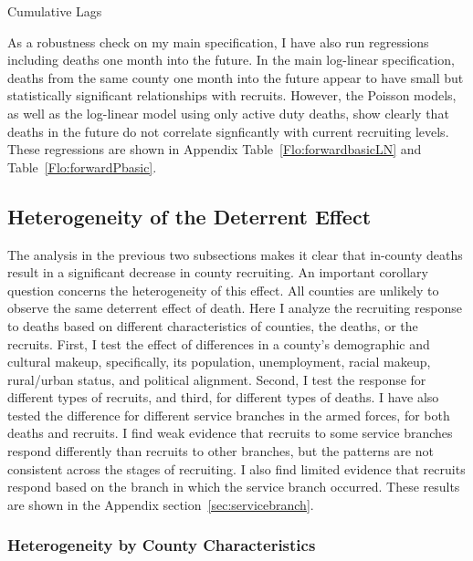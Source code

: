 \documentclass[12pt] {article}
\begin{document}
\begin{table}
\caption{Cumulative Lags}
\label{Flo:Cumulative LagsLN}
\scalebox{0.75}{}
\end{table}

As a robustness check on my main specification, I have also run regressions including deaths one month into the future. In the main log-linear specification, deaths from the same county one month into the future appear to have small but statistically significant relationships with recruits. However, the Poisson models, as well as the log-linear model using only active duty deaths, show clearly that deaths in the future do not correlate signficantly with current recruiting levels.  These regressions are shown in Appendix Table~\ref{Flo:forwardbasicLN} and Table~\ref{Flo:forwardPbasic}. 

\subsection{Heterogeneity of the Deterrent Effect\label{sub:interactions}}

The analysis in the previous two subsections makes it clear that in-county
deaths result in a significant decrease in county recruiting. An important
corollary question concerns the heterogeneity of this effect.
All counties are unlikely to observe the same deterrent effect of
death. Here I analyze the recruiting response to deaths based
on different characteristics of counties, the deaths, or the recruits. First, I test the effect of differences in a county's demographic and cultural makeup, specifically, its population, unemployment, racial makeup, rural/urban status, and political alignment. Second, I test the response for different types of recruits, and third, for different types of deaths. I have also tested the difference for different service branches in the armed forces, for both deaths and recruits. I find weak evidence that recruits to some service branches respond differently than recruits to other branches, but the patterns are not consistent across the stages of recruiting. I also find limited evidence that recruits respond based on the branch in which the service branch occurred. These results are shown in the Appendix section~\ref{sec:servicebranch}.   

\subsubsection{Heterogeneity by County Characteristics}
\end{document}
